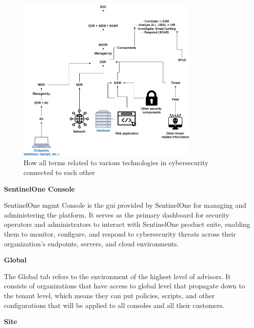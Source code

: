 \begin{figure}[htbp]
      \centering
      \includegraphics[width=0.8\textwidth]{Figures/XDR.jpg}
      \caption{How all terms related to various technologies in cybersecurity connected to each other}
      \label{fig:xdr}
\end{figure}


\textbf{SentinelOne Console}

SentinelOne \acrshort{mgmt} Console is the \acrshort{gui} provided by SentinelOne for managing and administering the platform. It serves
as the primary dashboard for security operators and administrators to interact with SentinelOne product suite, enabling them to monitor,
configure, and respond to cybersecurity threats across their organization's endpoints, servers, and cloud environments.

\textbf{Global}

The Global tab refers to the environment of the highest level of advisors. It consists of organizations that have access to global level
that propagate down to the tenant level, which means they can put policies, scripts, and other configurations that will be applied to all
consoles and all their customers.

\textbf{Site}

